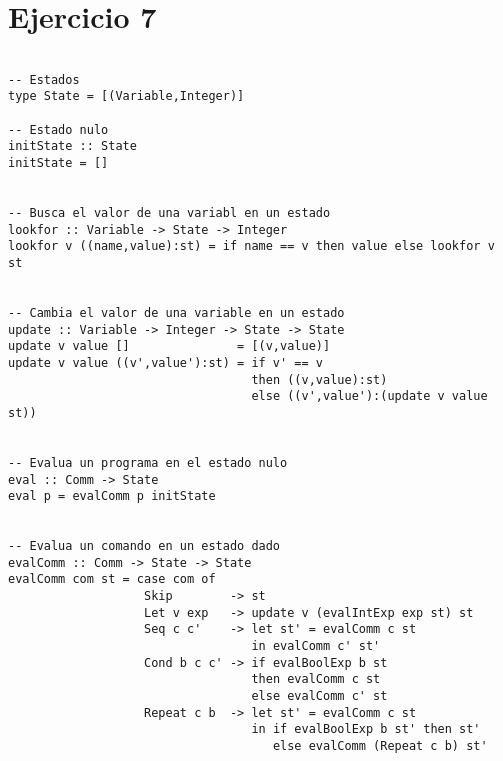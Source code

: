 \documentclass[12pt,a4paper]{article}
\begin{document}
\newpage

\section*{Ejercicio 7}
\begin{verbatim}

-- Estados
type State = [(Variable,Integer)]

-- Estado nulo
initState :: State
initState = []


-- Busca el valor de una variabl en un estado
lookfor :: Variable -> State -> Integer
lookfor v ((name,value):st) = if name == v then value else lookfor v st


-- Cambia el valor de una variable en un estado
update :: Variable -> Integer -> State -> State
update v value []               = [(v,value)]
update v value ((v',value'):st) = if v' == v 
                                  then ((v,value):st)
                                  else ((v',value'):(update v value st))


-- Evalua un programa en el estado nulo
eval :: Comm -> State
eval p = evalComm p initState


-- Evalua un comando en un estado dado
evalComm :: Comm -> State -> State
evalComm com st = case com of
                   Skip        -> st
                   Let v exp   -> update v (evalIntExp exp st) st
                   Seq c c'    -> let st' = evalComm c st
                                  in evalComm c' st'
                   Cond b c c' -> if evalBoolExp b st
                                  then evalComm c st
                                  else evalComm c' st
                   Repeat c b  -> let st' = evalComm c st
                                  in if evalBoolExp b st' then st'
                                     else evalComm (Repeat c b) st'

\end{verbatim}
\newpage
\end{document}
